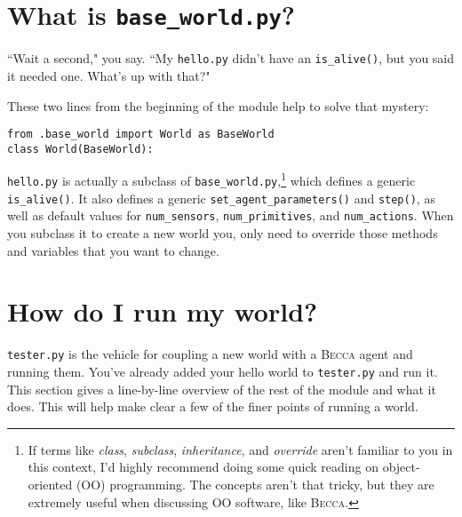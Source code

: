 \section{What is \texttt{base\_world.py}?}
``Wait a second," you say. ``My \texttt{hello.py} didn't have an \texttt{is\_alive()}, but you said it needed one. What's up with that?"

These two lines from the beginning of the module help to solve that mystery:
\begin{verbatim}
from .base_world import World as BaseWorld
class World(BaseWorld):
\end{verbatim}

\texttt{hello.py} is actually a subclass of \texttt{base\_world.py},\footnote{If terms like {\em class}, {\em subclass}, {\em inheritance}, and {\em override} aren't familiar to you in this context, I'd highly recommend doing some quick reading on object-oriented (OO) programming. The concepts aren't that tricky, but they are extremely useful when discussing OO software, like \textsc{Becca}.} which defines a generic \texttt{is\_alive()}. It also defines a generic \texttt{set\_agent\_parameters()} and \texttt{step()}, as well as default values for  \texttt{num\_sensors}, \texttt{num\_primitives}, and \texttt{num\_actions}. When you subclass it to create a new world you, only need to override those methods and variables that you want to change.


\section{How do I run my world?}
\texttt{tester.py} is the vehicle for coupling a new world with a \textsc{Becca} agent and running them. You've already added your hello world to \texttt{tester.py} and run it. This section gives a line-by-line overview of the rest of the module and what it does. This will help make clear a few of the finer points of running a world.


